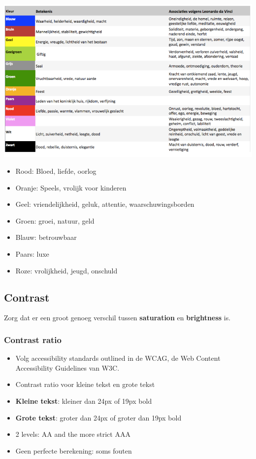 \documentclass{article}
\newcommand{\bold}[1]{\textbf{#1}}
\begin{document}
\includegraphics[width=\textwidth]{img/Screenshot_20200217_092401.png}

\begin{itemize}
    \item Rood: Bloed, liefde, oorlog
    \item Oranje: Speels, vrolijk voor kinderen
    \item Geel: vriendelijkheid, geluk, attentie, waarschuwingsborden
    \item Groen: groei, natuur, geld
    \item Blauw: betrouwbaar
    \item Paars: luxe
    \item Roze: vrolijkheid, jeugd, onschuld
\end{itemize}

\subsection{Contrast}
Zorg dat er een groot genoeg verschil tussen \bold{saturation} en \bold{brightness} is.

\subsubsection{Contrast ratio}
\begin{itemize}
    \item Volg accessibility standards outlined in de WCAG, de Web Content Accessibility Guidelines van W3C.
    \item Contrast ratio voor kleine tekst en grote tekst
    \item \bold{Kleine tekst}: kleiner dan 24px of 19px bold
    \item \bold{Grote tekst}: groter dan 24px of groter dan 19px bold
    \item 2 levels: AA and the more strict AAA
    \item Geen perfecte berekening: soms fouten
\end{itemize}
\end{document}
